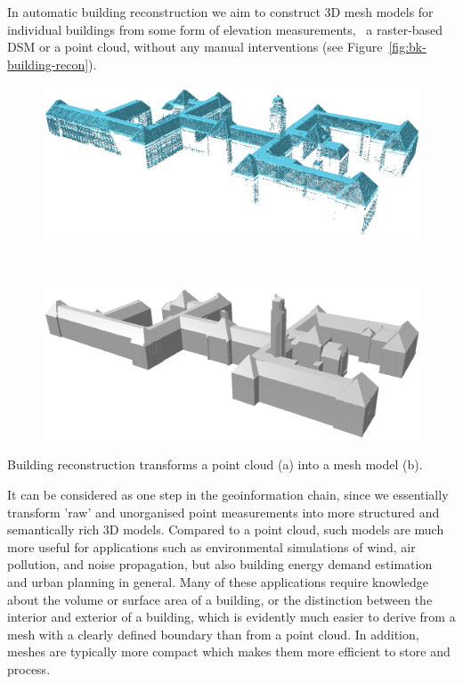 In automatic building reconstruction we aim to construct 3D mesh models for individual buildings from some form of elevation measurements, \ie\ a raster-based DSM or a point cloud, without any manual interventions (see Figure~\ref{fig:bk-building-recon}).
\begin{marginfigure}
	\centering
	\begin{subfigure}{\linewidth}
		\includegraphics[width=\linewidth]{figs/bk-pointcloud.png}
		\caption{}%
		\label{subfig:bk-pc}
	\end{subfigure}
\\
	\begin{subfigure}{\linewidth}
		\includegraphics[width=\linewidth]{figs/bk-mesh.png}
		\caption{}%
		\label{subfig:bk-mesh}
	\end{subfigure}
	\caption{Building reconstruction transforms a point cloud (a) into a mesh model (b).}%
	\label{fig:bk-building-recon}
\end{marginfigure}
It can be considered as one step in the geoinformation chain, since we essentially transform 'raw' and unorganised point measurements into more structured and semantically rich 3D models.
Compared to a point cloud, such models are much more useful for applications such as environmental simulations of wind, air pollution, and noise propagation, but also building energy demand estimation and urban planning in general.
Many of these applications require knowledge about the volume or surface area of a building, or the distinction between the interior and exterior of a building, which is evidently much easier to derive from a mesh with a clearly defined boundary than from a point cloud.
In addition, meshes are typically more compact which makes them more efficient to store and process.


